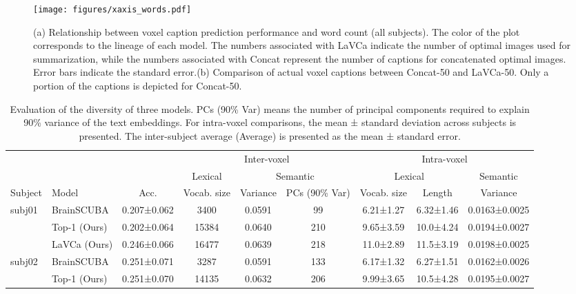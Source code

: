 \clearpage
\begin{figure*}[t] %
  \centering
  \texttt{[image: figures/xaxis\_words.pdf]}
  \caption{(a) Relationship between voxel caption prediction performance and word count (all subjects). The color of the plot corresponds to the lineage of each model. The numbers associated with LaVCa indicate the number of optimal images used for summarization, while the numbers associated with Concat represent the number of captions for concatenated optimal images. Error bars indicate the standard error.(b) Comparison of actual voxel captions between Concat-50 and LaVCa-50. Only a portion of the captions is depicted for Concat-50.
}
  \label{appendix:xaxis_words_all_sub}
\end{figure*}

\clearpage
\begin{table*}[t]
\centering
\caption{Evaluation of the diversity of three models. PCs (90\% Var) means the number of principal components required to explain 90\% variance of the text embeddings. For intra-voxel comparisons, the mean ± standard deviation across subjects is presented. The inter-subject average (Average) is presented as the mean ± standard error.}
\vskip 0.15in
\small %
\scriptsize
\begin{tabular}{@{}llccccccc@{}}
\toprule
 & & & \multicolumn{3}{c}{Inter-voxel} & \multicolumn{3}{c}{Intra-voxel} \\
\cmidrule(lr){4-6}\cmidrule(lr){7-9}
 & & & \multicolumn{1}{c}{Lexical} & \multicolumn{2}{c}{Semantic} & \multicolumn{2}{c}{Lexical} & \multicolumn{1}{c}{Semantic}\\
\cmidrule(lr){4-4}\cmidrule(lr){5-6}\cmidrule(lr){7-8}\cmidrule(lr){9-9}
Subject & Model & Acc. & Vocab. size & Variance & PCs (90\% Var) & Vocab. size & Length & Variance \\ 
\midrule
\multirow{3}{*}{subj01} 
 & BrainSCUBA          &  0.207±0.062 & 3400 & 0.0591 &  99  &  6.21±1.27 &  6.32±1.46 & 0.0163±0.0025 \\
 & Top-1 (Ours)     &  0.202±0.064 & 15384 & 0.0640 & 210 &  9.65±3.59 & 10.0±4.24 & 0.0194±0.0027 \\
 & LaVCa (Ours)        &  0.246±0.066 & 16477 & 0.0639 & 218 & 11.0±2.89 & 11.5±3.19 & 0.0198±0.0025 \\ 
\midrule
\multirow{3}{*}{subj02} 
 & BrainSCUBA          &  0.251±0.071 & 3287 & 0.0591 & 133 &  6.17±1.32 &  6.27±1.51 & 0.0162±0.0026 \\
 & Top-1 (Ours)     &  0.251±0.070 & 14135 & 0.0632 & 206 &  9.99±3.65 & 10.5±4.28 & 0.0195±0.0027 \\

\end{tabular}
\end{table*}
